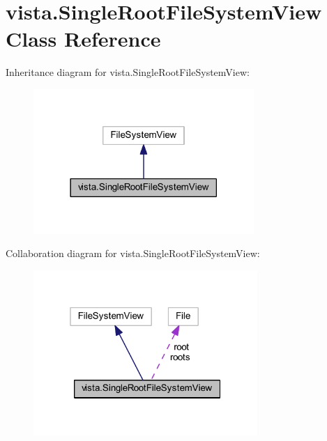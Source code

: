 \hypertarget{classvista_1_1_single_root_file_system_view}{}\section{vista.\+Single\+Root\+File\+System\+View Class Reference}
\label{classvista_1_1_single_root_file_system_view}


Inheritance diagram for vista.\+Single\+Root\+File\+System\+View\+:
\nopagebreak
\begin{figure}[H]
\begin{center}
\leavevmode
\includegraphics[width=237pt]{classvista_1_1_single_root_file_system_view__inherit__graph}
\end{center}
\end{figure}


Collaboration diagram for vista.\+Single\+Root\+File\+System\+View\+:
\nopagebreak
\begin{figure}[H]
\begin{center}
\leavevmode
\includegraphics[width=241pt]{classvista_1_1_single_root_file_system_view__coll__graph}
\end{center}
\end{figure}
